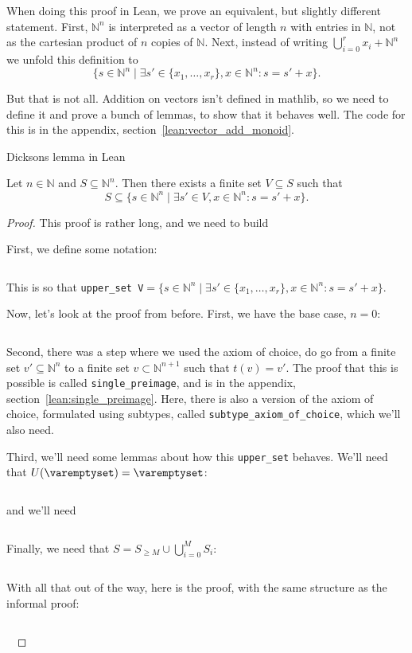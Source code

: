 \documentclass[a4paper, 12pt]{article}
\newcommand{\N}{\mathbb{N}}
\newcommand{\lean}[1]{\texttt{#1}}
\theoremstyle{changedot}
\theoremstyle{changedotbreak}
\theoremstyle{nonumberplain}
\newtheorem{proof}{Proof}
\begin{document}
When doing this proof in Lean, we prove an equivalent, but slightly different statement. First, $\N^{n}$ is interpreted as a vector of length $n$ with entries in $\N$, not as the cartesian product of $n$ copies of $\N$. Next, instead of writing $\bigcup_{i=0}^{r} x_{i} + \N^{n}$ we unfold this definition to
\[\{s \in \N^{n} \mid \exists s' \in \{x_{1}, \dots, x_{r}\}, x \in \N^{n} : s = s' + x\}.\]

But that is not all. Addition on vectors isn't defined in mathlib, so we need to define it and prove a bunch of lemmas, to show that it behaves well. The code for this is in the appendix, section~\ref{lean:vector_add_monoid}.



\begin{lemma} Dicksons lemma in Lean

  Let $n \in \N$ and $S \subseteq \N^{n}$. Then there exists a finite set $V \subseteq S$ such that \[S \subseteq \{s \in \N^{n} \mid \exists s' \in V, x \in \N^{n} : s = s' + x\}.\]

\end{lemma}
\begin{proof}
  This proof is rather long, and we need to build

  First, we define some notation:

  \inputminted[firstline=84, lastline=89]{lean}{../src/dickson.lean}

  This is so that \lean{upper_set V}$= \{s \in \N^{n} \mid \exists s' \in \{x_{1}, \dots, x_{r}\}, x \in \N^{n} : s = s' + x\}.$

  Now, let's look at the proof from before. First, we have the base case, $n = 0$:
  \inputminted[firstline=81, lastline=107]{lean}{../src/dickson.lean}

  Second, there was a step where we used the axiom of choice, do go from a finite set $v' \subseteq \N^{n}$ to a finite set $v \subset \N^{n+1}$ such that $t(v) = v'$. The proof that this is possible is called \lean{single_preimage}, and is in the appendix, section~\ref{lean:single_preimage}. Here, there is also a version of the axiom of choice, formulated using subtypes, called \lean{subtype_axiom_of_choice}, which we'll also need.

  Third, we'll need some lemmas about how this \lean{upper_set} behaves. We'll need that $U(\varemptyset) = \varemptyset$:

  \inputminted[firstline=109, lastline=116]{lean}{../src/dickson.lean}

  and we'll need

  \inputminted[firstline=148, lastline=175]{lean}{../src/dickson.lean}

  Finally, we need that $S = S_{\ge M} \cup \bigcup_{i=0}^{M} S_{i}$:

  \inputminted[firstline=118, lastline=146]{lean}{../src/dickson.lean}

  With all that out of the way, here is the proof, with the same structure as the informal proof:

  \inputminted[firstline=177]{lean}{../src/dickson.lean}
  ~
\end{proof}
\end{document}
